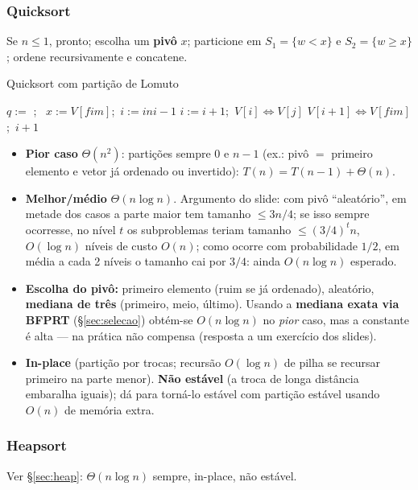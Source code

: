 \subsubsection*{Quicksort}
Se $n\le1$, pronto; escolha um \textbf{pivô} $x$; particione em $S_1=\{w<x\}$ e $S_2=\{w\ge x\}$; ordene recursivamente e concatene.
\begin{pseudo}{Quicksort com partição de Lomuto}
\begin{algorithmic}
    \State $q:=$ 
    \State {};\ 
  \EndIf
\EndProcedure
{}
  \State $x:=V[fim]$;\ $i:=ini-1$ 
     \State $i:=i+1$;\ $V[i]\Leftrightarrow V[j]$ \EndIf
  \EndFor
  \State $V[i+1]\Leftrightarrow V[fim]$;\ \Return $i+1$
\EndFunction
\end{algorithmic}
\end{pseudo}
\begin{itemize}
  \item \textbf{Pior caso} $\Theta(n^2)$: partições sempre $0$ e $n-1$ (ex.: pivô $=$ primeiro elemento e vetor já ordenado ou invertido): $T(n)=T(n-1)+\Theta(n)$.
  \item \textbf{Melhor/médio} $\Theta(n\log n)$. Argumento do slide: com pivô ``aleatório'', em metade dos casos a parte maior tem tamanho $\le 3n/4$; se isso sempre ocorresse, no nível $t$ os subproblemas teriam tamanho $\le(3/4)^tn$, $O(\log n)$ níveis de custo $O(n)$; como ocorre com probabilidade $1/2$, em média a cada 2 níveis o tamanho cai por $3/4$: ainda $O(n\log n)$ esperado.
  \item \textbf{Escolha do pivô:} primeiro elemento (ruim se já ordenado), aleatório, \textbf{mediana de três} (primeiro, meio, último). Usando a \textbf{mediana exata via BFPRT} (§\ref{sec:selecao}) obtém-se $O(n\log n)$ no \emph{pior} caso, mas a constante é alta --- na prática não compensa (resposta a um exercício dos slides).
  \item \textbf{In-place} (partição por trocas; recursão $O(\log n)$ de pilha se recursar primeiro na parte menor). \textbf{Não estável} (a troca de longa distância embaralha iguais); dá para torná-lo estável com partição estável usando $O(n)$ de memória extra.
\end{itemize}

\subsubsection*{Heapsort} Ver §\ref{sec:heap}: $\Theta(n\log n)$ sempre, in-place, não estável.

